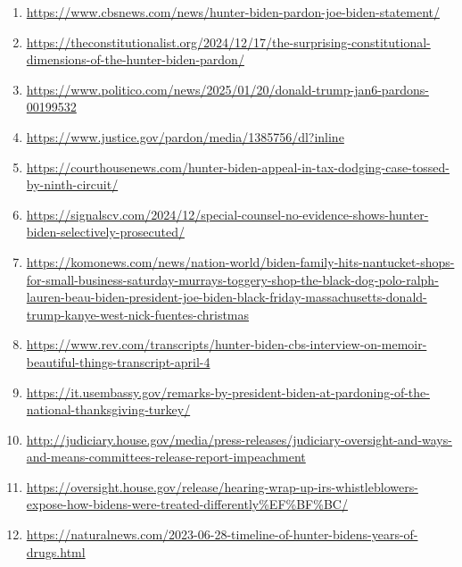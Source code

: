 \documentclass[10pt,a4paper]{article}
\begin{document}
\begin{enumerate}[leftmargin=*]
            \item \url{ https://www.cbsnews.com/news/hunter-biden-pardon-joe-biden-statement/ }
            \item \url{ https://theconstitutionalist.org/2024/12/17/the-surprising-constitutional-dimensions-of-the-hunter-biden-pardon/ }
            \item \url{ https://www.politico.com/news/2025/01/20/donald-trump-jan6-pardons-00199532 }
            \item \url{ https://www.justice.gov/pardon/media/1385756/dl?inline }
            \item \url{ https://courthousenews.com/hunter-biden-appeal-in-tax-dodging-case-tossed-by-ninth-circuit/ }
            \item \url{ https://signalscv.com/2024/12/special-counsel-no-evidence-shows-hunter-biden-selectively-prosecuted/ }
            \item \url{ https://komonews.com/news/nation-world/biden-family-hits-nantucket-shops-for-small-business-saturday-murrays-toggery-shop-the-black-dog-polo-ralph-lauren-beau-biden-president-joe-biden-black-friday-massachusetts-donald-trump-kanye-west-nick-fuentes-christmas }
            \item \url{ https://www.rev.com/transcripts/hunter-biden-cbs-interview-on-memoir-beautiful-things-transcript-april-4 }
            \item \url{ https://it.usembassy.gov/remarks-by-president-biden-at-pardoning-of-the-national-thanksgiving-turkey/ }
            \item \url{ http://judiciary.house.gov/media/press-releases/judiciary-oversight-and-ways-and-means-committees-release-report-impeachment }
            \item \url{ https://oversight.house.gov/release/hearing-wrap-up-irs-whistleblowers-expose-how-bidens-were-treated-differently\%EF\%BF\%BC/ }
            \item \url{ https://naturalnews.com/2023-06-28-timeline-of-hunter-bidens-years-of-drugs.html }
    \end{enumerate}
\vspace{1em}
\end{document}
